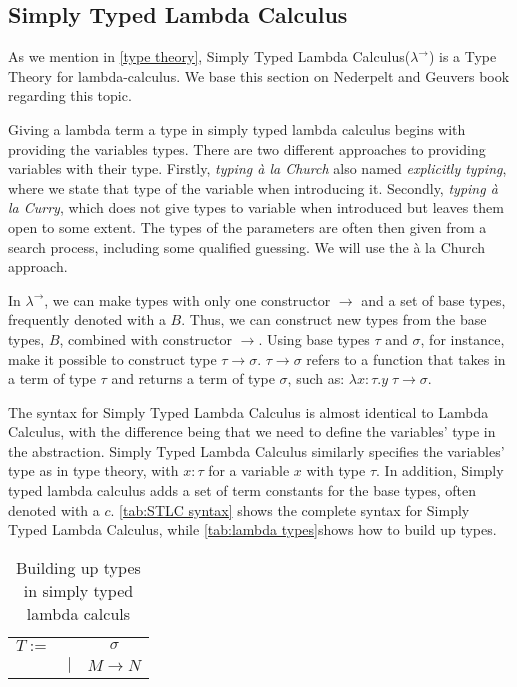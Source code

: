 \subsection{Simply Typed Lambda Calculus}
\label{Simply Typed Lambda Calculus}
As we mention in \autoref{type theory}, Simply Typed Lambda Calculus($\lambda^\rightarrow$) is a Type Theory for lambda-calculus. We base this section on Nederpelt and Geuvers book \autocite{nederpelt_geuvers_2014} regarding this topic. 

\para
Giving a lambda term a type in simply typed lambda calculus begins with providing the variables types.  There are two different approaches to providing variables with their type. Firstly, \emph{typing à la Church} also named \emph{explicitly typing}, where we state that type of the variable when introducing it. Secondly, \emph{typing à la Curry}, which does not give types to variable when introduced but leaves them open to some extent. The types of the parameters are often then given from a search process, including some qualified guessing. We will use the à la Church approach.

\para
In $\lambda^\rightarrow$, we can make types with only one constructor $\rightarrow$ and a set of base types, frequently denoted with a $B$. Thus, we can construct new types from the base types, $B$, combined with constructor $\rightarrow$. Using base types $\tau$ and $\sigma$, for instance, make it possible to construct type $\tau \rightarrow \sigma$. $\tau \rightarrow \sigma$ refers to a function that takes in a term of type $\tau$ and returns a term of type $\sigma$, such as: $\lambda x:\tau. y \; \tau \rightarrow \sigma$. 

\para
The syntax for Simply Typed Lambda Calculus is almost identical to Lambda Calculus, with the difference being that we need to define the variables' type in the abstraction. Simply Typed Lambda Calculus similarly specifies the variables' type as in type theory, with $x:\tau$ for a variable $x$ with type $\tau$. In addition, Simply typed lambda calculus adds a set of term constants for the base types, often denoted with a $c$. \autoref{tab:STLC syntax} shows the complete syntax for Simply Typed Lambda Calculus, while \autoref{tab:lambda types}shows how to build up types. 

\begin{table}[]
    \centering
    \begin{tabular}{c c c}
         $T :=$&  & $\sigma$\\
         & $|$ & $M \rightarrow N$ \\
    \end{tabular}
    \caption{Building up types in simply typed lambda calculs}
    \label{tab:lambda types}
\end{table}


